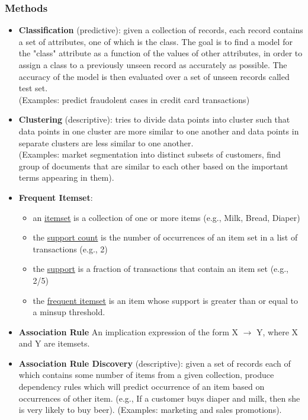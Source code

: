 \documentclass[10pt,a4paper]{article}
\begin{document}
\subsubsection{Methods}
\begin{itemize}
	\item \textbf{Classification} (predictive): given a collection of records, each record contains a set of attributes, one of which is the class. The goal is to find a model for the "class" attribute as a function of the values of other attributes, in order to assign a class to a previously unseen record as accurately as possible. The accuracy of the model is then evaluated over a set of unseen records called test set. \\ (Examples: predict fraudolent cases in credit card transactions)
	\item \textbf{Clustering} (descriptive): tries to divide data points into cluster such that data points in one cluster are more similar to one another and data points in separate clusters are less similar to one another. \\ 
	(Examples: market segmentation into distinct subsets of customers, find group of documents that are similar to each other based on the important terms appearing in them).
	\item \textbf{Frequent Itemset}: 
	\begin{itemize}
		\item an \uline{itemset} is a collection of one or more items (e.g., {Milk, Bread, Diaper})
		\item the \uline{support count} is the number of occurrences of an item set in a list of transactions (e.g., 2)
		\item the \uline{support} is a fraction of transactions that contain an item set (e.g., 2/5)
		\item the \uline{frequent itemset} is an item whose support is greater than or equal to a minsup threshold.
	\end{itemize}	 
	\item \textbf{Association Rule} An implication expression of the form X $\rightarrow$ Y, where X and Y are itemsets.
	\item \textbf{Association Rule Discovery} (descriptive): given a set of records each of which contains some number of items from a given collection, produce dependency rules which will predict occurrence of an item based on occurrences of other item. (e.g., If a customer buys diaper and milk, then she is very likely to buy beer). (Examples: marketing and sales promotions).

\end{itemize}
\end{document}
